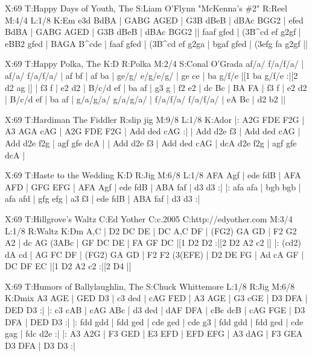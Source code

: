 \documentclass[letterpaper]{article}
\begin{document}
\begin{abc}[name]
X:69
T:Happy Days of Youth, The
S:Liam O'Flynn "McKenna's \#2"
R:Reel
M:4/4
L:1/8
K:Em
e3d BdBA | GABG AGED | G3B dBeB | dBAc BGG2 |
efed BdBA | GABG AGED | G3B dBeB | dBAc BGG2 ||
faaf gfed | (3B^cd ef g2gf | eBB2 gfed | BAGA B^cde |
faaf gfed | (3B^cd ef g2ga | bgaf gfed | (3efg fa g2gf ||
\end{abc}

\begin{abc}[name]
X:69
T:Happy Polka, The
K:D
R:Polka
M:2/4
S:Conal O'Grada
af/a/ f/a/f/a/ |  af/a/ f/a/f/a/ | af bf | af ba |
ge/g/ e/g/e/g/ | ge ce | ba g/f/e |[1 ba g/f/e :|[2 d2 ag |]
| f3 f | e2 d2 | B/c/d ef | ba af |
g3 g | f2 e2 | dc Bc | BA FA |
f3 f | e2 d2 | B/c/d ef | ba af |
g/a/g/a/ g/a/g/a/ | f/a/f/a/ f/a/f/a/ | eA Bc | d2 b2 ||
\end{abc}

\begin{abc}[name]
X:69
T:Hardiman The Fiddler
R:slip jig
M:9/8
L:1/8
K:Ador
|: A2G FDE F2G | A3 AGA cAG | A2G FDE F2G | Add ded cAG :|
| Add d2e f3 | Add ded cAG | Add d2e f2g | agf gfe dcA |
| Add d2e f3 | Add ded cAG | dcA d2e f2g | agf gfe dcA |
\end{abc}

\begin{abc}[name]
X:69
T:Haste to the Wedding
K:D
R:Jig
M:6/8
L:1/8
AFA Agf | ede fdB | AFA AFD | GFG EFG |
AFA Agf | ede fdB | ABA faf | d3 d3 :|
|: afa afa | bgb bgb | afa afd | gfg efg |
a3 f3 | ede fdB | ABA faf | d3 d3 :|
\end{abc}

\begin{abc}[name]
X:69
T:Hillgrove's Waltz
C:Ed Yother
C:c.2005
C:http://edyother.com
M:3/4
L:1/8
R:Waltz
K:Dm
A,C | D2 DC DE | DC A,C DF | ({F}G2) GA GD | F2 G2 A2 |
 dc AG  (3ABc | GF DC DE | FA  GF  DC |[1 D2 D2 :|[2 D2 A2 c2 |]
|: ({c}d2) dA cd | AG FC DF | ({F}G2) GA GD | F2 F2 (3(EFE) |
 D2 DE FG | Ad cA GF | DC  DF  EC |[1 D2 A2 c2 :|[2  D4 |]
\end{abc}

\begin{abc}[name]
X:69
T:Humors of Ballylaughlin, The
S:Chuck Whittemore
L:1/8
R:Jig
M:6/8
K:Dmix
A3 AGE | GED D3 | c3 ded | cAG FED |
A3 AGE | G3 cGE | D3 DFA | DED D3 :|
|: c3 cAB | cAG ABc | d3 ded | dAF DFA |
cBc dcB | cAG FGE | D3 DFA | DED D3 :|
|: fdd gdd | fdd ged | cde ged | cde g3 |
fdd gdd | fdd ged | cde gag | fdc d2e :|
|: A3 A2G | F3 GED | E3 EFD | EFD EFG |
A3 dAG | F3 GEA D3 DFA | D3 D3 :|
\end{abc}
\end{document}
